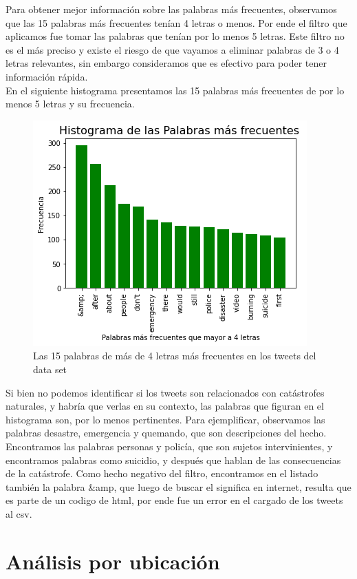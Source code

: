 \documentclass[]{article}
\begin{document}
Para obtener mejor informaci\'on sobre las palabras m\'as frecuentes, observamos que las 15 palabras m\'as frecuentes ten\'ian 4 letras o menos. Por ende el filtro que aplicamos fue tomar las palabras que ten\'ian por lo menos 5 letras. Este filtro no es el m\'as preciso y existe el riesgo de que vayamos a eliminar palabras de 3 o 4 letras relevantes, sin embargo consideramos que es efectivo para poder tener informaci\'on r\'apida. \\

En el siguiente histograma presentamos las 15 palabras m\'as frecuentes de por lo menos 5 letras y su frecuencia. 
 \begin{figure}[H]
	\centering
	\includegraphics[width=0.75\linewidth]{histograma1}
	\caption[]{Las 15 palabras de m\'as de 4 letras m\'as frecuentes en los tweets del data set}
\end{figure}

Si bien no podemos identificar si los tweets son relacionados con cat\'astrofes naturales, y habr\'ia que verlas en su contexto, las palabras que figuran en el histograma son, por lo menos pertinentes. Para ejemplificar, observamos las palabras desastre, emergencia y quemando, que son descripciones del hecho. Encontramos las palabras personas y polic\'ia, que son sujetos intervinientes, y encontramos palabras como suicidio, y despu\'es que hablan de las consecuencias de la cat\'astrofe. Como hecho negativo del filtro, encontramos en el listado tambi\'en la palabra \&amp, que luego de buscar el significa en internet, resulta que es parte de un codigo de html, por ende fue un error en el cargado de los tweets al csv. 

\section{An\'alisis por ubicaci\'on}
\end{document}
